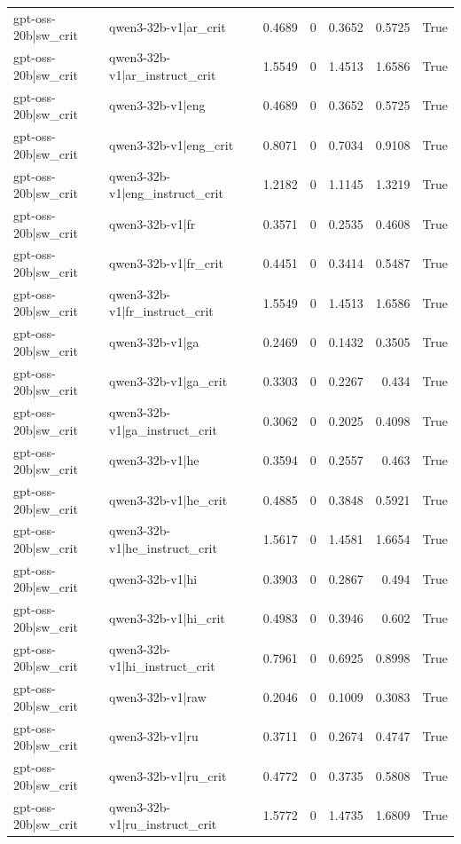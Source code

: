 \begin{table}
\begin{tabular}{l l r r r r l}
gpt-oss-20b|sw_crit & qwen3-32b-v1|ar_crit & 0.4689 & 0 & 0.3652 & 0.5725 & True \\
gpt-oss-20b|sw_crit & qwen3-32b-v1|ar_instruct_crit & 1.5549 & 0 & 1.4513 & 1.6586 & True \\
gpt-oss-20b|sw_crit & qwen3-32b-v1|eng & 0.4689 & 0 & 0.3652 & 0.5725 & True \\
gpt-oss-20b|sw_crit & qwen3-32b-v1|eng_crit & 0.8071 & 0 & 0.7034 & 0.9108 & True \\
gpt-oss-20b|sw_crit & qwen3-32b-v1|eng_instruct_crit & 1.2182 & 0 & 1.1145 & 1.3219 & True \\
gpt-oss-20b|sw_crit & qwen3-32b-v1|fr & 0.3571 & 0 & 0.2535 & 0.4608 & True \\
gpt-oss-20b|sw_crit & qwen3-32b-v1|fr_crit & 0.4451 & 0 & 0.3414 & 0.5487 & True \\
gpt-oss-20b|sw_crit & qwen3-32b-v1|fr_instruct_crit & 1.5549 & 0 & 1.4513 & 1.6586 & True \\
gpt-oss-20b|sw_crit & qwen3-32b-v1|ga & 0.2469 & 0 & 0.1432 & 0.3505 & True \\
gpt-oss-20b|sw_crit & qwen3-32b-v1|ga_crit & 0.3303 & 0 & 0.2267 & 0.434 & True \\
gpt-oss-20b|sw_crit & qwen3-32b-v1|ga_instruct_crit & 0.3062 & 0 & 0.2025 & 0.4098 & True \\
gpt-oss-20b|sw_crit & qwen3-32b-v1|he & 0.3594 & 0 & 0.2557 & 0.463 & True \\
gpt-oss-20b|sw_crit & qwen3-32b-v1|he_crit & 0.4885 & 0 & 0.3848 & 0.5921 & True \\
gpt-oss-20b|sw_crit & qwen3-32b-v1|he_instruct_crit & 1.5617 & 0 & 1.4581 & 1.6654 & True \\
gpt-oss-20b|sw_crit & qwen3-32b-v1|hi & 0.3903 & 0 & 0.2867 & 0.494 & True \\
gpt-oss-20b|sw_crit & qwen3-32b-v1|hi_crit & 0.4983 & 0 & 0.3946 & 0.602 & True \\
gpt-oss-20b|sw_crit & qwen3-32b-v1|hi_instruct_crit & 0.7961 & 0 & 0.6925 & 0.8998 & True \\
gpt-oss-20b|sw_crit & qwen3-32b-v1|raw & 0.2046 & 0 & 0.1009 & 0.3083 & True \\
gpt-oss-20b|sw_crit & qwen3-32b-v1|ru & 0.3711 & 0 & 0.2674 & 0.4747 & True \\
gpt-oss-20b|sw_crit & qwen3-32b-v1|ru_crit & 0.4772 & 0 & 0.3735 & 0.5808 & True \\
gpt-oss-20b|sw_crit & qwen3-32b-v1|ru_instruct_crit & 1.5772 & 0 & 1.4735 & 1.6809 & True \\

\end{tabular}
\end{table}
